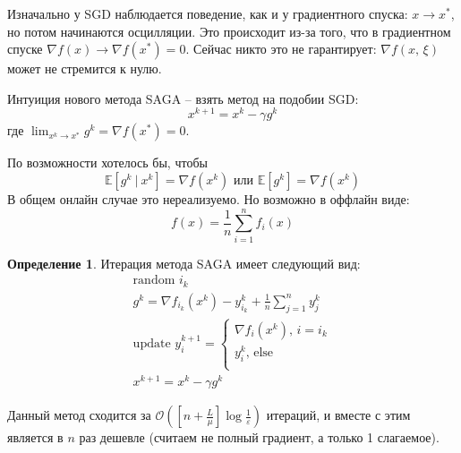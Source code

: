 \documentclass[a4paper,12pt]{article}
\theoremstyle{plain}
\theoremstyle{definition}
\newtheorem{definition}{Определение}[section]
\theoremstyle{remark}
\begin{document}
Изначально у SGD наблюдается поведение, как и у градиентного спуска: $x \to x^*$, но потом начинаются осцилляции. Это происходит из-за того, что в градиентном спуске $\nabla f(x) \to \nabla f(x^*) = 0$. Сейчас никто это не гарантирует: $\nabla f(x,\, \xi)$ может не стремится к нулю.

Интуиция нового метода SAGA -- взять метод на подобии SGD:
\[
  x^{k + 1} = x^k - \gamma g^k
\]
где $\lim_{x^k \to x^*} g^k = \nabla f(x^*) = 0$.

По возможности хотелось бы, чтобы
\[
  \mathbb{E}\left[g^k \:\vert\: x^k\right] = \nabla f(x^k) \text{ или } \mathbb{E}[g^k] = \nabla f(x^k)
\]
В общем онлайн случае это нереализуемо. Но возможно в оффлайн виде:
\[
  f(x) = \frac{1}{n}\sum_{i = 1}^n f_i(x)
\]

\begin{definition}
  Итерация метода SAGA имеет следующий вид:
  \begin{align*}
    \text{random }i_k\\
    g^k = \nabla f_{i_k}(x^k) - y_{i_k}^k + \frac{1}{n}\sum_{j = 1}^n y_j^k\\
    \text{update }y_i^{k + 1} = 
    \begin{cases}
      \nabla f_i(x^k),\, i = i_k\\
      y_i^k,\, \text{else}\\
    \end{cases}\\
    x^{k + 1} = x^k - \gamma g^k
  \end{align*}
\end{definition}

Данный метод сходится за $\mathcal{O}\left(\left[n + \frac{L}{\mu}\right]\log\frac{1}{\varepsilon}\right)$ итераций, и вместе с этим является в $n$ раз дешевле (считаем не полный градиент, а только 1 слагаемое).
\end{document}
